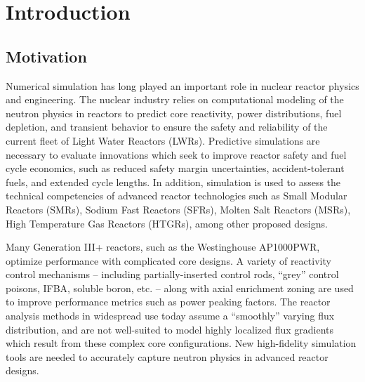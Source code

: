 \chapter{Introduction}
\label{chap:intro}

\section{Motivation}
\label{sec:chap1-motivation}


Numerical simulation has long played an important role in nuclear reactor physics and engineering. The nuclear industry relies on computational modeling of the neutron physics in reactors to predict core reactivity, power distributions, fuel depletion, and transient behavior to ensure the safety and reliability of the current fleet of Light Water Reactors (LWRs). Predictive simulations are necessary to evaluate innovations which seek to improve reactor safety and fuel cycle economics, such as reduced safety margin uncertainties, accident-tolerant fuels, and extended cycle lengths. In addition, simulation is used to assess the technical competencies of advanced reactor technologies such as Small Modular Reactors (SMRs), Sodium Fast Reactors (SFRs), Molten Salt Reactors (MSRs), High Temperature Gas Reactors (HTGRs), among other proposed designs. 

Many Generation III+ reactors, such as the Westinghouse AP1000\texttrademark \ac{PWR}, optimize performance with complicated core designs. A variety of reactivity control mechanisms -- including partially-inserted control rods, ``grey'' control poisons, \ac{IFBA}, soluble boron, etc. -- along with axial enrichment zoning are used to improve performance metrics such as power peaking factors. The reactor analysis methods in widespread use today assume a ``smoothly'' varying flux distribution, and are not well-suited to model highly localized flux gradients which result from these complex core configurations. New high-fidelity simulation tools are needed to accurately capture neutron physics in advanced reactor designs.



